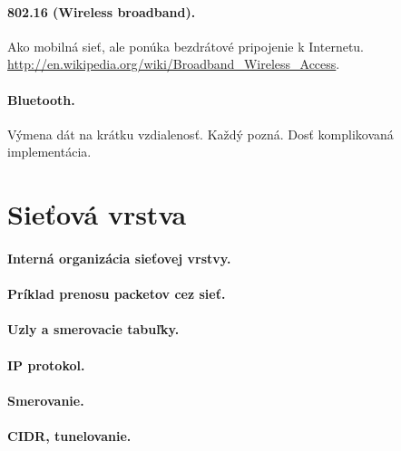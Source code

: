 {{\paragraph{802.16 (Wireless broadband).}
Ako mobilná sieť, ale ponúka bezdrátové pripojenie k Internetu.
\url{http://en.wikipedia.org/wiki/Broadband_Wireless_Access}. 
       
\paragraph{Bluetooth.}           
Výmena dát na krátku vzdialenosť. Každý pozná. 
Dosť komplikovaná implementácia. 
                                                 
\section{Sieťová vrstva}                      
\paragraph{Interná organizácia sieťovej vrstvy.} 
\paragraph{Príklad prenosu packetov cez sieť.} 
\paragraph{Uzly a smerovacie tabuľky.}     
\paragraph{IP protokol.}               
\paragraph{Smerovanie.}             
\paragraph{CIDR, tunelovanie.}                                                                     
}}
